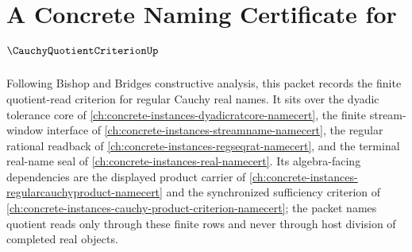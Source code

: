 \chapter{A Concrete Naming Certificate for $\CauchyQuotientCriterionUp$}
\label{ch:concrete-instances-cauchy-quotient-criterion-namecert}

Following Bishop and Bridges constructive analysis, this packet records the finite quotient-read criterion for regular Cauchy real names. It sits over the dyadic tolerance core of \autoref{ch:concrete-instances-dyadicratcore-namecert}, the finite stream-window interface of \autoref{ch:concrete-instances-streamname-namecert}, the regular rational readback of \autoref{ch:concrete-instances-regseqrat-namecert}, and the terminal real-name seal of \autoref{ch:concrete-instances-real-namecert}. Its algebra-facing dependencies are the displayed product carrier of \autoref{ch:concrete-instances-regularcauchyproduct-namecert} and the synchronized sufficiency criterion of \autoref{ch:concrete-instances-cauchy-product-criterion-namecert}; the packet names quotient reads only through these finite rows and never through host division of completed real objects.


